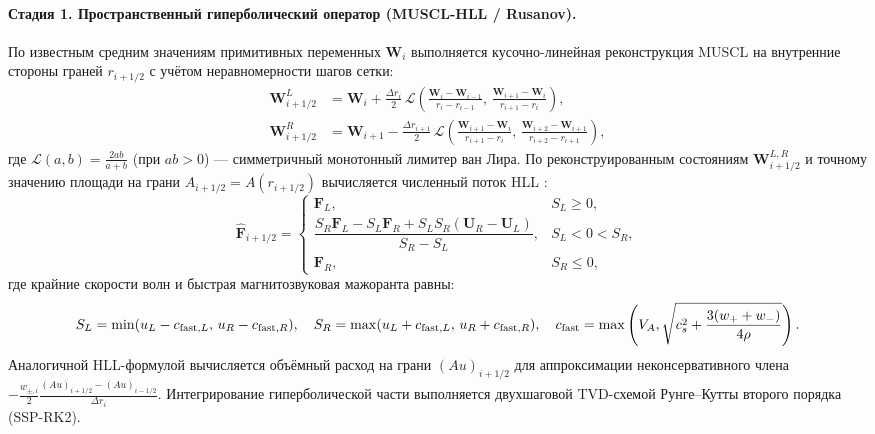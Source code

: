 \documentclass[11pt,a4paper]{article}
\begin{document}
\paragraph{Стадия 1. Пространственный гиперболический оператор (MUSCL-HLL / Rusanov).}
По известным средним значениям примитивных переменных $\bm{W}_i$ выполняется кусочно-линейная реконструкция MUSCL на внутренние стороны граней $r_{i+1/2}$ с учётом неравномерности шагов сетки:
\begin{equation}
\begin{aligned}
\bm{W}_{i+1/2}^L &= \bm{W}_i + \frac{\Delta r_i}{2}\,\mathcal{L}\!\left(\frac{\bm{W}_i - \bm{W}_{i-1}}{r_i - r_{i-1}},\, \frac{\bm{W}_{i+1} - \bm{W}_i}{r_{i+1} - r_i}\right), \\[4pt]
\bm{W}_{i+1/2}^R &= \bm{W}_{i+1} - \frac{\Delta r_{i+1}}{2}\,\mathcal{L}\!\left(\frac{\bm{W}_{i+1} - \bm{W}_i}{r_{i+1} - r_i},\, \frac{\bm{W}_{i+2} - \bm{W}_{i+1}}{r_{i+2} - r_{i+1}}\right),
\end{aligned}
\label{eq:muscl_nonuniform}
\end{equation}
где $\mathcal{L}(a, b) = \frac{2ab}{a+b}$ (при $ab > 0$) --- симметричный монотонный лимитер ван Лира. По реконструированным состояниям $\bm{W}_{i+1/2}^{L,R}$ и точному значению площади на грани $A_{i+1/2} = A(r_{i+1/2})$ вычисляется численный поток HLL \cite{HLL1983}:
\begin{equation}
\hat{\bm{F}}_{i+1/2} =
\begin{cases}
\bm{F}_L, & S_L \ge 0,\\[4pt]
\dfrac{S_R\bm{F}_L - S_L\bm{F}_R + S_L S_R(\bm{U}_R - \bm{U}_L)}{S_R - S_L}, & S_L < 0 < S_R,\\[8pt]
\bm{F}_R, & S_R \le 0,
\end{cases}
\label{eq:hll_formula}
\end{equation}
где крайние скорости волн и быстрая магнитозвуковая мажоранта равны:
\[
S_L = \min(u_L - c_{{\rm fast},L},\, u_R - c_{{\rm fast},R}), \quad
S_R = \max(u_L + c_{{\rm fast},L},\, u_R + c_{{\rm fast},R}), \quad
c_{\rm fast} = \max\left(V_A, \sqrt{c_s^2 + \frac{3(w_+ + w_-)}{4\rho}}\right).
\]
Аналогичной HLL-формулой вычисляется объёмный расход на грани $(Au)_{i+1/2}$ для аппроксимации неконсервативного члена $-\frac{w_{\pm,i}}{2}\frac{(Au)_{i+1/2} - (Au)_{i-1/2}}{\Delta r_i}$. Интегрирование гиперболической части выполняется двухшаговой TVD-схемой Рунге--Кутты второго порядка (SSP-RK2).
\end{document}
